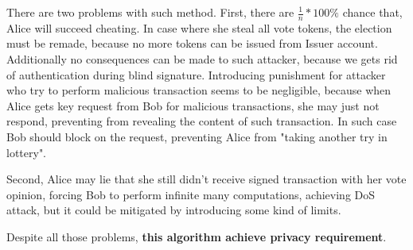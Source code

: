 \documentclass[runningheads]{llncs}
\begin{document}
There are two problems with such method.
First, there are \(\frac{1}{n}*100\%\) chance that, Alice will succeed cheating. In case where she steal all vote tokens, the election must be remade, because no more tokens can be issued from Issuer account. Additionally no consequences can be made to such attacker, because we gets rid of authentication during blind signature. Introducing punishment for attacker who try to perform malicious transaction seems to be negligible, because when Alice gets key request from Bob for malicious transactions, she may just not respond, preventing from revealing the content of such transaction. In such case Bob should block on the request, preventing Alice from "taking another try in lottery".

Second, Alice may lie that she still didn't receive signed transaction with her vote opinion, forcing Bob to perform infinite many computations, achieving DoS attack, but it could be mitigated by introducing some kind of limits.

Despite all those problems, \textbf{this algorithm achieve privacy requirement}.


\end{document}

